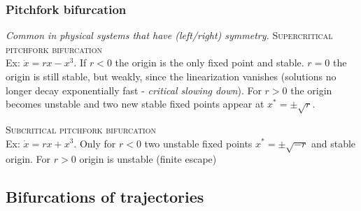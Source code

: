 \subsubsection{Pitchfork bifurcation}
\emph{Common in physical systems that have (left/right) symmetry.}
\textsc{Supercritical pitchfork bifurcation}\\
Ex: $\dot{x}=rx-x^3$. If $r<0$ the origin is the only fixed point and stable. $r=0$ the origin is still stable, but weakly, since the linearization vanishes (solutions no longer decay exponentially fast - \emph{critical slowing down}).  For $r>0$ the origin becomes unstable and two new stable fixed points appear at $x^*=\pm \sqrt{r}$.
\begin{center}
\end{center}
\vspace{0.2cm}

\textsc{Subcritical pitchfork bifurcation}\\
Ex: $\dot{x}=rx+x^3$. Only for $r<0$ two unstable fixed points $x^*=\pm \sqrt{-r}$ and stable origin. For $r>0$ origin is unstable (finite escape)
\begin{center}
\end{center}

\subsection{Bifurcations of trajectories}













